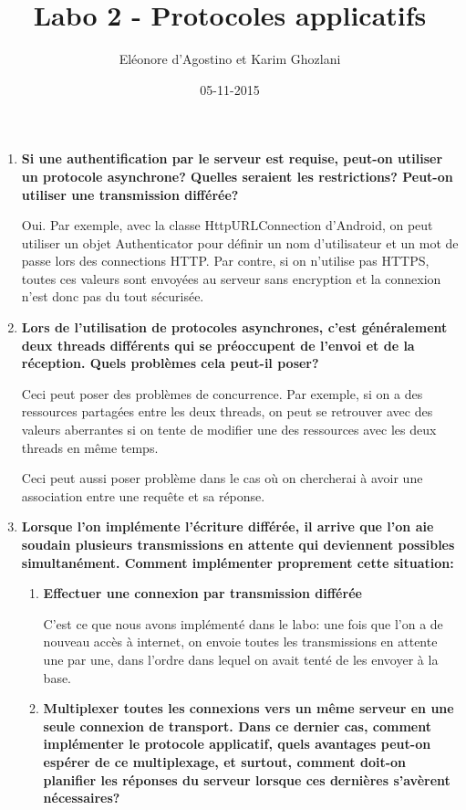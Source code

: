 \documentclass{article}
\title{Labo 2 - Protocoles applicatifs}
\date{05-11-2015}
\author{Eléonore d'Agostino et Karim Ghozlani}
\begin{document}
  \maketitle
  \newpage

  \begin{enumerate}
    \item \textbf{Si une authentification par le serveur est requise, peut-on utiliser un protocole asynchrone? Quelles seraient les restrictions? Peut-on utiliser une transmission différée?}

      Oui. Par exemple, avec la classe HttpURLConnection d'Android, on peut utiliser un objet Authenticator pour définir un nom d'utilisateur et un mot de passe lors des connections HTTP. Par contre, si on n'utilise pas HTTPS, toutes ces valeurs sont envoyées au serveur sans encryption et la connexion n'est donc pas du tout sécurisée.

    \item \textbf{Lors de l'utilisation de protocoles asynchrones, c'est généralement deux threads différents qui se préoccupent de l'envoi et de la réception. Quels problèmes cela peut-il poser?}
      
      Ceci peut poser des problèmes de concurrence. Par exemple, si on a des ressources partagées entre les deux threads, on peut se retrouver avec des valeurs aberrantes si on tente de modifier une des ressources avec les deux threads en même temps.
	  
	  Ceci peut aussi poser problème dans le cas où on chercherai à avoir une association entre une requête et sa réponse.

    \item \textbf{Lorsque l'on implémente l'écriture différée, il arrive que l'on aie soudain plusieurs transmissions en attente qui deviennent possibles simultanément. Comment implémenter proprement cette situation:}
      
      \begin{enumerate}
        \item \textbf{Effectuer une connexion par transmission différée}
        
        C'est ce que nous avons implémenté dans le labo: une fois que l'on a de nouveau accès à internet, on envoie toutes les transmissions en attente une par une, dans l'ordre dans lequel on avait tenté de les envoyer à la base.
    
        \item \textbf{Multiplexer toutes les connexions vers un même serveur en une seule connexion de transport. Dans ce dernier cas, comment implémenter le protocole applicatif, quels avantages peut-on espérer de ce multiplexage, et surtout, comment doit-on planifier les réponses du serveur lorsque ces dernières s'avèrent nécessaires?}
    

\end{enumerate}
\end{enumerate}
\end{document}
